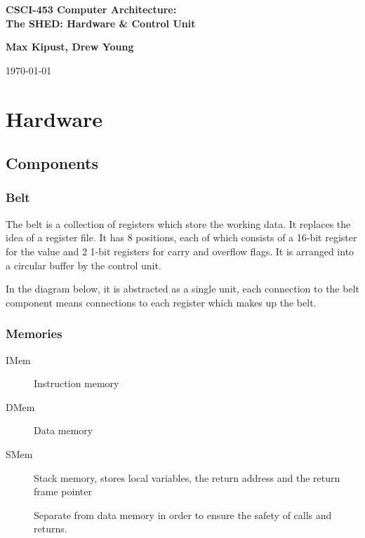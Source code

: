 \documentclass{report}
\newcommand{\hmwkTitle}{The SHED: Hardware \& Control Unit}
\newcommand{\hmwkClass}{CSCI-453 Computer Architecture}
\newcommand{\hmwkAuthorName}{\textbf{Max Kipust, Drew Young}}
\begin{document}
\begin{titlepage}
	\renewcommand*{\thepage}{Title}

	\begin{center}
		\vspace{2in}
		\textmd{\textbf{\Huge \hmwkClass:\\ \hmwkTitle}}\\
		\vspace{3in}

		\hmwkAuthorName

		\vfill

		{\large \today}
	\end{center}
\end{titlepage}

\chapter{Hardware}

	\section{Components}

		\subsection{Belt}

			The belt is a collection of registers which store the working data.
			It replaces the idea of a register file.
			It has 8 positions, each of which consists of a 16-bit register for the value and 2 1-bit registers for carry and overflow flags.
			It is arranged into a circular buffer by the control unit.

			In the diagram below, it is abstracted as a single unit, each connection to the belt component means connections to each register which makes up the belt.

		\subsection{Memories}

			\begin{description}
				\item[IMem] Instruction memory
				\item[DMem] Data memory
				\item[SMem] Stack memory, stores local variables, the return address and the return frame pointer

					Separate from data memory in order to ensure the safety of calls and returns.
			\end{description}
\end{document}
